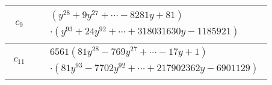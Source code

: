 \documentclass[1p]{elsarticle_modified}
\theoremstyle{definition}
\begin{document}
\begin{tabular}{m{50pt}|m{274pt}}
\hline $$\begin{aligned}c_{9}\end{aligned}$$&$\begin{aligned}
&(y^{28}+9 y^{27}+\cdots-8281 y+81)\\
&\cdot(y^{93}+24 y^{92}+\cdots+318031630 y-1185921)
\end{aligned}$\\
\hline $$\begin{aligned}c_{11}\end{aligned}$$&$\begin{aligned}
&6561(81 y^{28}-769 y^{27}+\cdots-17 y+1)\\
&\cdot(81 y^{93}-7702 y^{92}+\cdots+217902362 y-6901129)
\end{aligned}$\\
\hline
\end{tabular}
\vskip 2pc
\end{document}
